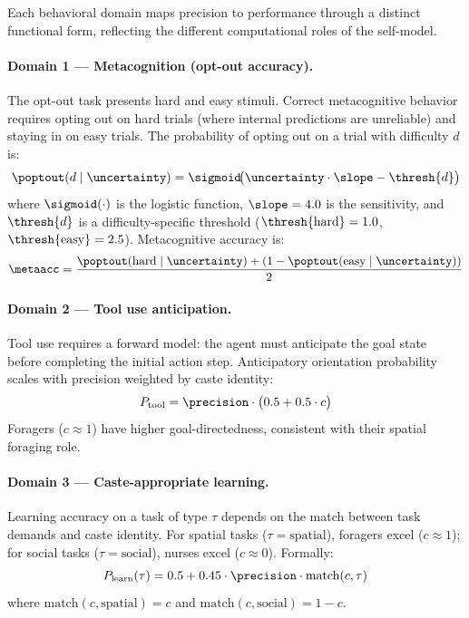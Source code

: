 Each behavioral domain maps precision to performance through a distinct functional form, reflecting
the different computational roles of the self-model.

\paragraph{Domain 1 --- Metacognition (opt-out accuracy).}
The opt-out task presents hard and easy stimuli. Correct metacognitive behavior requires opting out on
hard trials (where internal predictions are unreliable) and staying in on easy trials. The probability
of opting out on a trial with difficulty $d$ is:
\begin{equation}
  \poptout(d \mid \uncertainty) = \sigmoid\!\bigl(\uncertainty \cdot \slope - \thresh{d}\bigr)
\end{equation}
where $\sigmoid(\cdot)$ is the logistic function, $\slope = 4.0$ is the sensitivity, and $\thresh{d}$
is a difficulty-specific threshold ($\thresh{\text{hard}} = 1.0$, $\thresh{\text{easy}} = 2.5$).
Metacognitive accuracy is:
\begin{equation}
  \metaacc = \frac{\poptout(\text{hard} \mid \uncertainty) + (1 - \poptout(\text{easy} \mid \uncertainty))}{2}
  \label{eq:meta}
\end{equation}

\paragraph{Domain 2 --- Tool use anticipation.}
Tool use requires a forward model: the agent must anticipate the goal state before completing the
initial action step. Anticipatory orientation probability scales with precision weighted by caste
identity:
\begin{equation}
  P_{\text{tool}} = \precision \cdot \bigl(0.5 + 0.5 \cdot c\bigr)
\end{equation}
Foragers ($c \approx 1$) have higher goal-directedness, consistent with their spatial foraging role.

\paragraph{Domain 3 --- Caste-appropriate learning.}
Learning accuracy on a task of type $\tau$ depends on the match between task demands and caste
identity. For spatial tasks ($\tau = \text{spatial}$), foragers excel ($c \approx 1$); for social
tasks ($\tau = \text{social}$), nurses excel ($c \approx 0$). Formally:
\begin{equation}
  P_{\text{learn}}(\tau) = 0.5 + 0.45 \cdot \precision \cdot \text{match}(c, \tau)
\end{equation}
where $\text{match}(c, \text{spatial}) = c$ and $\text{match}(c, \text{social}) = 1 - c$.


